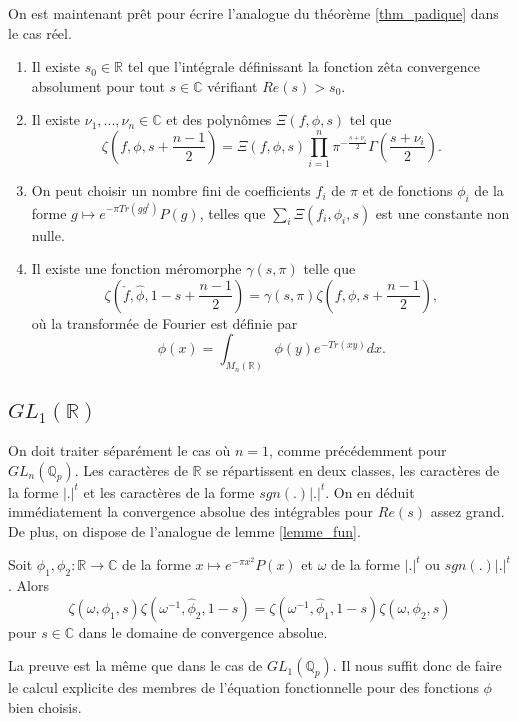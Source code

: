On est maintenant prêt pour écrire l'analogue du théorème \ref{thm_padique} dans le cas réel.
\begin{theoreme}
\label{thm_reel}
\begin{enumerate}
\item Il existe $s_0 \in \mathbb{R}$ tel que l'intégrale définissant la fonction zêta convergence absolument pour tout $s \in \mathbb{C}$ vérifiant $Re(s) > s_0$.
\item Il existe $\nu_1, ..., \nu_n \in \mathbb{C}$ et des polynômes $\Xi(f,\phi,s)$ tel que
\begin{equation}
\zeta(f, \phi, s+ \frac{n-1}{2}) = \Xi(f, \phi, s)\prod_{i=1}^n \pi^{-\frac{s+\nu_i}{2}}\Gamma(\frac{s+\nu_i}{2}).
\end{equation}
\item On peut choisir un nombre fini de coefficients $f_i$ de $\pi$ et de fonctions $\phi_i$ de la forme $g \mapsto e^{-\pi Tr(gg^t)}P(g)$, telles que $\sum_i \Xi(f_i, \phi_i, s)$ est une constante non nulle.
\item Il existe une fonction méromorphe $\gamma(s, \pi)$ telle que
\begin{equation}
\zeta(\check{f}, \hat{\phi}, 1-s+\frac{n-1}{2}) = \gamma(s, \pi)\zeta(f, \phi, s + \frac{n-1}{2}),
\end{equation}
où la transformée de Fourier est définie par
\begin{equation}
\hat{\phi}(x) = \int_{M_n(\mathbb{R})}\phi(y)e^{-Tr(xy)}dx.
\end{equation}
\end{enumerate}
\end{theoreme}

\subsection{$GL_1(\mathbb{R})$}

On doit traiter séparément le cas où $n=1$, comme précédemment pour $GL_n(\mathbb{Q}_p)$. Les caractères de $\mathbb{R}$ se répartissent en deux classes, les caractères de la forme $|.|^t$ et les caractères de la forme $sgn(.)|.|^t$. On en déduit immédiatement la convergence absolue des intégrables pour $Re(s)$ assez grand. De plus, on dispose de l'analogue de lemme \ref{lemme_fun}.
\begin{lemme}
Soit $\phi_1, \phi_2 : \mathbb{R} \rightarrow \mathbb{C}$ de la forme $x \mapsto e^{-\pi x^2}P(x)$ et $\omega$ de la forme $|.|^t$ ou $sgn(.)|.|^t$. Alors
\begin{equation}
\zeta(\omega, \phi_1, s)\zeta(\omega^{-1}, \hat{\phi}_2, 1-s)=\zeta(\omega^{-1}, \hat{\phi}_1, 1-s)\zeta(\omega, \phi_2, s)
\end{equation}
pour $s \in \mathbb{C}$ dans le domaine de convergence absolue.
\end{lemme}
La preuve est la même que dans le cas de $GL_1(\mathbb{Q}_p)$. Il nous suffit donc de faire le calcul explicite des membres de l'équation fonctionnelle pour des fonctions $\phi$ bien choisis.

